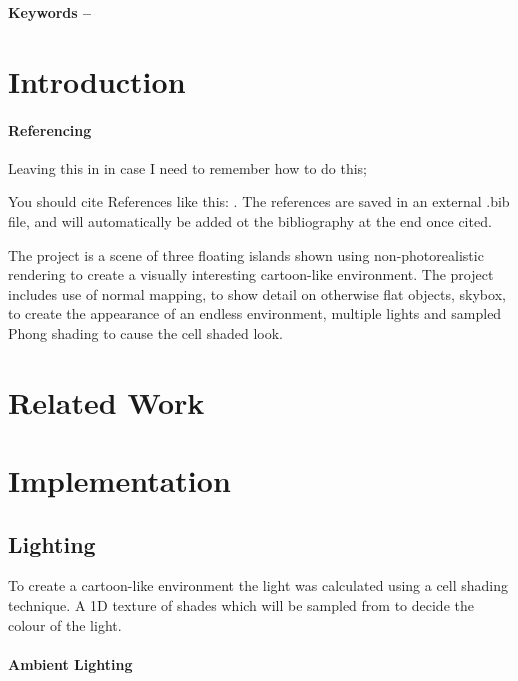 \documentclass[10pt, a4paper]{article}
\title{\mytitle}
\author{\myauthor\hspace{1em}\\\contact\\Edinburgh Napier University\hspace{0.5em}-\hspace{0.5em}\mymodule}
\date{}
\begin{document}
	\maketitle
	\begin{abstract}
		This project aim is to create a real time 3d enviroment using OpenGL and C++. The intent is to create a 3D scene shaded as is it where a cartoon. blah blah blah come back to this when there's some stuff in my report.
	\end{abstract}
    
	\textbf{Keywords -- }{\mykeywords}
	\section{Introduction}
    \paragraph{Referencing}
    Leaving this in in case I need to remember how to do this;
    
    You should cite References like this: \cite{Keshav}. The references are saved in an external .bib file, and will automatically be added ot the bibliography at the end once cited.
    
    The project is a scene of three floating islands shown using non-photorealistic rendering to create a visually interesting cartoon-like environment. The project includes use of normal mapping, to show detail on otherwise flat objects, skybox, to create the appearance of an endless environment, multiple lights and sampled Phong shading to cause the cell shaded look. 
    
    \section{Related Work}
    
    \section{Implementation}
    \subsection{Lighting}
    To create a cartoon-like environment the light was calculated using a cell shading technique. A 1D texture of shades which will be sampled from to decide the colour of the light.
	
	\paragraph{Ambient Lighting}
	
\end{document}
